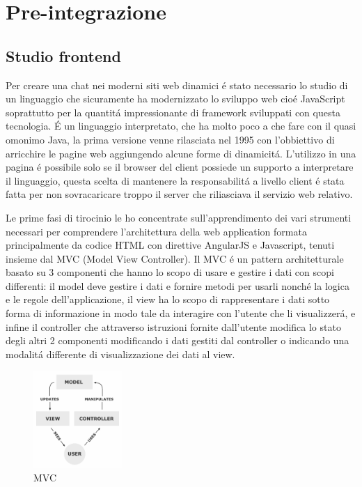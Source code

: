 \chapter{Pre-integrazione}


\section{Studio frontend}
Per creare una chat nei moderni siti web dinamici \'e stato necessario lo studio di un linguaggio che sicuramente ha modernizzato lo sviluppo web cio\'e JavaScript soprattutto per la quantit\'a impressionante di framework sviluppati con questa tecnologia.
\'E un linguaggio interpretato, che ha molto poco a che fare con il quasi omonimo Java, la prima versione venne rilasciata nel 1995 con l'obbiettivo di arricchire le pagine web aggiungendo alcune forme di dinamicit\'a. L'utilizzo in una pagina \'e possibile solo se il browser del client possiede un supporto a interpretare il linguaggio, questa scelta di mantenere la responsabilit\'a a livello client \'e stata fatta per non sovracaricare troppo il server che riliasciava il servizio web relativo.

Le prime fasi di tirocinio le ho concentrate sull'apprendimento dei vari strumenti necessari per comprendere l'architettura della web application formata principalmente da codice HTML con direttive AngularJS e Javascript, tenuti insieme dal MVC (Model View Controller).
Il MVC \'e un pattern architetturale basato su 3 componenti che hanno lo scopo di usare e gestire i dati con scopi differenti: il model deve gestire i dati e fornire metodi per usarli nonch\'e la logica e le regole dell'applicazione, il view ha lo scopo di rappresentare i dati sotto forma di informazione in modo tale da interagire con l'utente che li visualizzer\'a, e infine il controller che attraverso istruzioni fornite dall'utente modifica lo stato degli altri 2 componenti modificando i dati gestiti dal controller o indicando una modalit\'a differente di visualizzazione dei dati al view.
\begin{figure}[H]
 \centering
  \includegraphics[width=0.3\textwidth]{img/MVC-Process.png}
 \caption{MVC}
 \end{figure}
